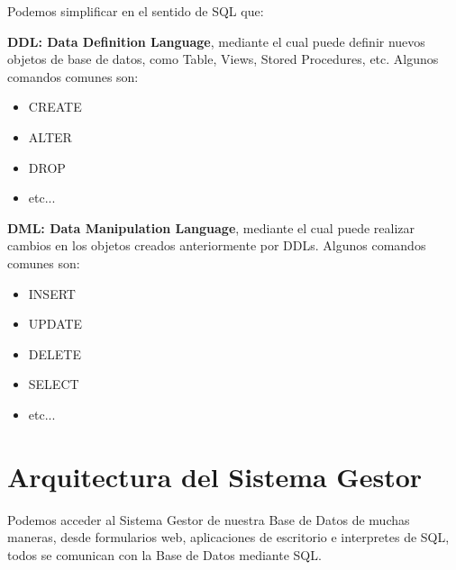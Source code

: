 \documentclass[12pt, fleqn]{report}                             %
\theoremstyle{break}                                            %
\begin{document}
            Podemos simplificar en el sentido de SQL que:

            \textbf{DDL: Data Definition Language}, mediante el cual puede definir nuevos objetos
            de base de datos, como Table, Views, Stored Procedures, etc.
            Algunos comandos comunes son:

            \begin{itemize}
                \item CREATE
                \item ALTER
                \item DROP
                \item etc...
            \end{itemize}


            \textbf{DML: Data Manipulation Language}, mediante el cual puede realizar cambios en
            los objetos creados anteriormente por DDLs. Algunos comandos comunes son:

            \begin{itemize}
                \item INSERT
                \item UPDATE
                \item DELETE
                \item SELECT
                \item etc...
            \end{itemize}




        \clearpage
        \section{Arquitectura del Sistema Gestor}

            Podemos acceder al Sistema Gestor de nuestra Base de Datos de muchas maneras, 
            desde formularios web, aplicaciones de escritorio e interpretes de SQL, todos se
            comunican con la Base de Datos mediante SQL.
\end{document}
